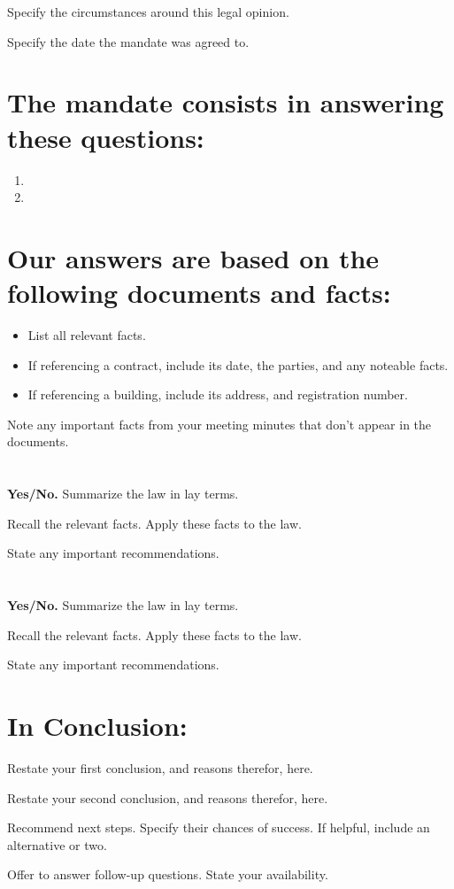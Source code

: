 Specify the circumstances around this legal opinion. 

Specify the date the mandate was agreed to.

\section*{The mandate consists in answering these questions:}
\begin{enumerate}
  \item \firstQuestion
  \item \secondQuestion
\end{enumerate}

\section*{Our answers are based on the following documents and facts:}
\begin{itemize}
  \item List all relevant facts.
  \item If referencing a contract, include its date, the parties, and any noteable facts.
  \item If referencing a building, include its address, and registration number.
\end{itemize}

Note any important facts from your meeting minutes that don't appear in the documents.

\section*{\textbf{\firstQuestion}}
\textbf{Yes/No.} Summarize the law in lay terms. 

Recall the relevant facts. Apply these facts to the law. 

State any important recommendations. 

\section*{\textbf{\secondQuestion}}
\textbf{Yes/No.} Summarize the law in lay terms. 

Recall the relevant facts. Apply these facts to the law. 

State any important recommendations. 

\section*{\textbf{In Conclusion:}}
Restate your first conclusion, and reasons therefor, here.

Restate your second conclusion, and reasons therefor, here.

Recommend next steps. Specify their chances of success. If helpful, include an alternative or two.

Offer to answer follow-up questions. State your availability.
